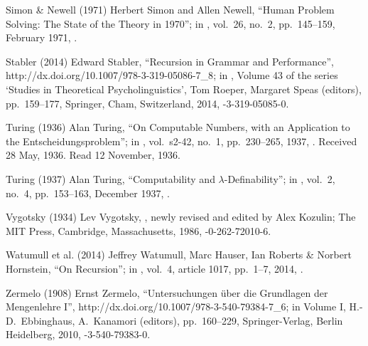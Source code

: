  Simon \& Newell (1971)
Herbert Simon and Allen Newell,
``Human Problem Solving: The State of the Theory in 1970'';
in ,
 vol.\ 26, no.\ 2, pp.\ 145--159, February 1971,
.

 Stabler (2014)
Edward Stabler,
``Recursion in Grammar and Performance'',\\
%
{http://dx.doi.org/10.1007/978-3-319-05086-7_8};
in ,
Volume 43 of the series `Studies in Theoretical Psycholinguistics',
Tom Roeper, Margaret Speas (editors),
pp.\ 159--177,
Springer, Cham, Switzerland, 2014,
-3-319-05085-0.

 Turing (1936)
Alan Turing,
``On Computable Numbers,
 with an Application to the Entscheidungsproblem'';
in ,
vol.\ s2-42, no.\ 1, pp.\ 230--265, 1937,
.
Received 28 May, 1936. Read 12 November, 1936.

 Turing (1937)
Alan Turing,
``Computability and $\lambda$-Definability''; in
,
vol.\ 2, no.\ 4, pp.\ 153--163, December 1937,
.

 Vygotsky (1934)
Lev Vygotsky,
,
newly revised and edited by Alex Kozulin;
The MIT Press, Cambridge, Massachusetts, 1986,
-0-262-72010-6.

 Watumull et al. (2014)
Jeffrey Watumull, Marc Hauser, Ian Roberts \& Norbert Hornstein,
``On Recursion''; in
,
vol.\ 4, article 1017, pp.\ 1--7, 2014,
.

 Zermelo (1908)
Ernst Zermelo,
``Untersuchungen \"uber die Grundlagen der Mengenlehre I'',
%
{http://dx.doi.org/10.1007/978-3-540-79384-7_6};
in  Volume I,
H.-D.\ Ebbinghaus, A.\ Kanamori (editors),
pp.\ 160--229,
Springer-Verlag, Berlin Heidelberg, 2010,
-3-540-79383-0.

\endinput

